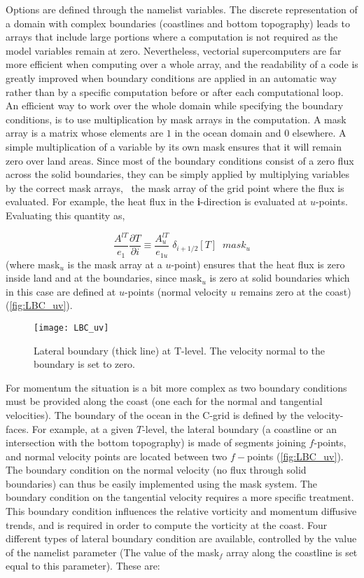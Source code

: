 \documentclass[../main/NEMO_manual]{subfiles}
\begin{document}
Options are defined through the  namelist variables.
The discrete representation of a domain with complex boundaries (coastlines and bottom topography) leads to
arrays that include large portions where a computation is not required as the model variables remain at zero.
Nevertheless, vectorial supercomputers are far more efficient when computing over a whole array,
and the readability of a code is greatly improved when boundary conditions are applied in
an automatic way rather than by a specific computation before or after each computational loop.
An efficient way to work over the whole domain while specifying the boundary conditions,
is to use multiplication by mask arrays in the computation.
A mask array is a matrix whose elements are $1$ in the ocean domain and $0$ elsewhere.
A simple multiplication of a variable by its own mask ensures that it will remain zero over land areas.
Since most of the boundary conditions consist of a zero flux across the solid boundaries,
they can be simply applied by multiplying variables by the correct mask arrays,
\ie\ the mask array of the grid point where the flux is evaluated.
For example, the heat flux in the \textbf{i}-direction is evaluated at $u$-points.
Evaluating this quantity as,

\[
  \frac{A^{lT} }{e_1 }\frac{\partial T}{\partial i}\equiv \frac{A_u^{lT}
  }{e_{1u} } \; \delta_{i+1 / 2} \left[ T \right]\;\;mask_u
\]
(where mask$_{u}$ is the mask array at a $u$-point) ensures that the heat flux is zero inside land and
at the boundaries, since mask$_{u}$ is zero at solid boundaries which in this case are defined at $u$-points
(normal velocity $u$ remains zero at the coast) (\autoref{fig:LBC_uv}).

\begin{figure}[!t]
  \centering
  \texttt{[image: LBC\_uv]}
  \caption[Lateral boundary at $T$-level]{
    Lateral boundary (thick line) at T-level.
    The velocity normal to the boundary is set to zero.}
  \label{fig:LBC_uv}
\end{figure}

For momentum the situation is a bit more complex as two boundary conditions must be provided along the coast
(one each for the normal and tangential velocities).
The boundary of the ocean in the C-grid is defined by the velocity-faces.
For example, at a given $T$-level,
the lateral boundary (a coastline or an intersection with the bottom topography) is made of
segments joining $f$-points, and normal velocity points are located between two $f-$points (\autoref{fig:LBC_uv}).
The boundary condition on the normal velocity (no flux through solid boundaries)
can thus be easily implemented using the mask system.
The boundary condition on the tangential velocity requires a more specific treatment.
This boundary condition influences the relative vorticity and momentum diffusive trends,
and is required in order to compute the vorticity at the coast.
Four different types of lateral boundary condition are available,
controlled by the value of the  namelist parameter
(The value of the mask$_{f}$ array along the coastline is set equal to this parameter).
These are:
\end{document}
